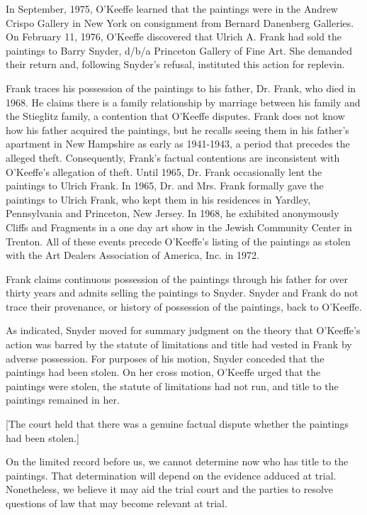 In September, 1975, O'Keeffe learned that the paintings were in the Andrew
Crispo Gallery in New York on consignment from Bernard Danenberg Galleries. On
February 11, 1976, O'Keeffe discovered that Ulrich A. Frank had sold the
paintings to Barry Snyder, d/b/a Princeton Gallery of Fine Art. She demanded
their return and, following Snyder's refusal, instituted this action for
replevin.

Frank traces his possession of the paintings to his father, Dr. Frank, who died
in 1968. He claims there is a family relationship by marriage between his
family and the Stieglitz family, a contention that O'Keeffe disputes. Frank
does not know how his father acquired the paintings, but he recalls seeing them
in his father's apartment in New Hampshire as early as 1941-1943, a period that
precedes the alleged theft. Consequently, Frank's factual contentions are
inconsistent with O'Keeffe's allegation of theft. Until 1965, Dr. Frank
occasionally lent the paintings to Ulrich Frank. In 1965, Dr. and Mrs. Frank
formally gave the paintings to Ulrich Frank, who kept them in his residences in
Yardley, Pennsylvania and Princeton, New Jersey. In 1968, he exhibited
anonymously Cliffs and Fragments in a one day art show in the Jewish Community
Center in Trenton. All of these events precede O'Keeffe's listing of the
paintings as stolen with the Art Dealers Association of America, Inc. in 1972.

Frank claims continuous possession of the paintings through his father for over
thirty years and admits selling the paintings to Snyder. Snyder and Frank do
not trace their provenance, or history of possession of the paintings, back to
O'Keeffe.

As indicated, Snyder moved for summary judgment on the theory that O'Keeffe's
action was barred by the statute of limitations and title had vested in Frank
by adverse possession. For purposes of his motion, Snyder conceded that the
paintings had been stolen. On her cross motion, O'Keeffe urged that the
paintings were stolen, the statute of limitations had not run, and title to the
paintings remained in her.


[The court held that there was a genuine factual dispute whether the paintings
had been stolen.]


On the limited record before us, we cannot determine now who has title to the
paintings. That determination will depend on the evidence adduced at trial.
Nonetheless, we believe it may aid the trial court and the parties to resolve
questions of law that may become relevant at trial.

